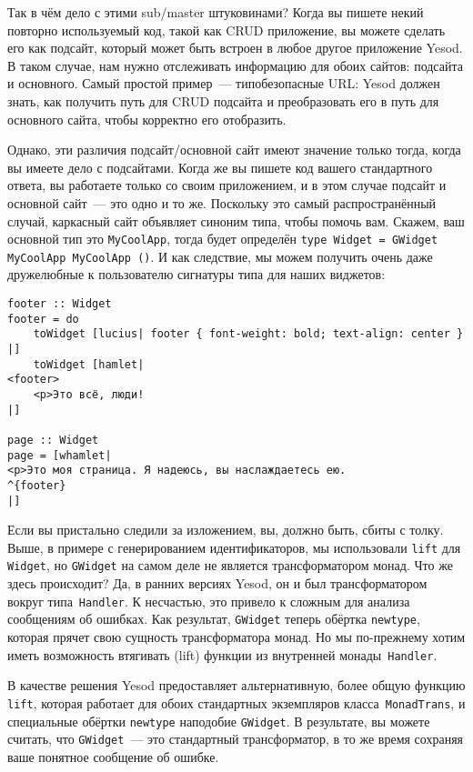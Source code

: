 Так в чём дело с этими sub/master штуковинами? Когда вы пишете некий повторно
используемый код, такой как CRUD приложение, вы можете сделать его как подсайт,
который может быть встроен в любое другое приложение Yesod. В таком случае, нам
нужно отслеживать информацию для обоих сайтов: подсайта и основного. Самый
простой пример~--- типобезопасные URL: Yesod должен знать, как получить путь
для CRUD подсайта и преобразовать его в путь для основного сайта, чтобы
корректно его отобразить.

Однако, эти различия подсайт/основной сайт имеют значение только тогда, когда
вы имеете дело с подсайтами. Когда же вы пишете код вашего стандартного ответа,
вы работаете только со своим приложением, и в этом случае подсайт и основной
сайт~--- это одно и то же. Поскольку это самый распространённый случай,
каркасный сайт объявляет синоним типа, чтобы помочь вам. Скажем, ваш основной
тип это \lstinline'MyCoolApp', тогда будет определён
\lstinline'type Widget = GWidget MyCoolApp MyCoolApp ()'.
И как следствие, мы можем получить очень даже дружелюбные к пользователю
сигнатуры типа для наших виджетов:
\begin{lstlisting}
footer :: Widget
footer = do
    toWidget [lucius| footer { font-weight: bold; text-align: center } |]
    toWidget [hamlet|
<footer>
    <p>Это всё, люди!
|]

page :: Widget
page = [whamlet|
<p>Это моя страница. Я надеюсь, вы наслаждаетесь ею.
^{footer}
|]
\end{lstlisting}

Если вы пристально следили за изложением, вы, должно быть, сбиты с толку. Выше,
в примере с генерированием идентификаторов, мы использовали \lstinline'lift'
для \lstinline'Widget', но \lstinline'GWidget' на самом деле не является
трансформатором монад. Что же здесь происходит? Да, в ранних версиях Yesod,
он и был трансформатором вокруг типа~\lstinline'Handler'. К несчастью, это
привело к сложным для анализа сообщениям об ошибках. Как результат,
\lstinline'GWidget' теперь обёртка \lstinline'newtype', которая прячет свою
сущность трансформатора монад. Но мы по-прежнему хотим иметь возможность
втягивать (lift) функции из внутренней монады~\lstinline'Handler'.

В качестве решения Yesod предоставляет альтернативную, более общую функцию
\lstinline'lift', которая работает для обоих стандартных экземпляров
класса~\lstinline'MonadTrans', и специальные обёртки \lstinline'newtype'
наподобие \lstinline'GWidget'.  В результате, вы можете считать, что
\lstinline'GWidget'~--- это стандартный трансформатор, в то же время сохраняя
ваше понятное сообщение об ошибке.

